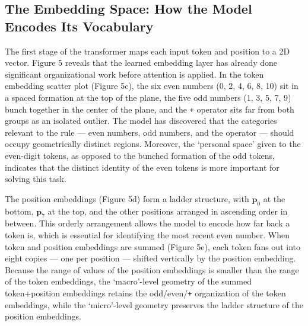\documentclass[
  11pt,
  a4paper,
]{article}
\begin{document}
\subsection{The Embedding Space: How the Model Encodes Its Vocabulary}\label{the-embedding-space-how-the-model-encodes-its-vocabulary}

The first stage of the transformer maps each input token and position to
a 2D vector. Figure 5 reveals that the learned embedding layer has
already done significant organizational work before attention is
applied. In the token embedding scatter plot (Figure 5c), the six even
numbers (0, 2, 4, 6, 8, 10) sit in a spaced formation at the top of the
plane, the five odd numbers (1, 3, 5, 7, 9) bunch together in the center
of the plane, and the \texttt{+} operator sits far from both groups as
an isolated outlier. The model has discovered that the categories
relevant to the rule --- even numbers, odd numbers, and the operator ---
should occupy geometrically distinct regions. Moreover, the `personal
space' given to the even-digit tokens, as opposed to the bunched
formation of the odd tokens, indicates that the distinct identity of the
even tokens is more important for solving this task.

The position embeddings (Figure 5d) form a ladder structure, with
\(\mathbf{p}_0\) at the bottom, \(\mathbf{p}_7\) at the top, and the
other positions arranged in ascending order in between. This orderly
arrangement allows the model to encode how far back a token is, which is
essential for identifying the most recent even number. When token and
position embeddings are summed (Figure 5e), each token fans out into
eight copies --- one per position --- shifted vertically by the position
embedding. Because the range of values of the position embeddings is
smaller than the range of the token embeddings, the `macro'-level
geometry of the summed token+position embeddings retains the
odd/even/\texttt{+} organization of the token embeddings, while the
`micro'-level geometry preserves the ladder structure of the position
embeddings.
\end{document}
